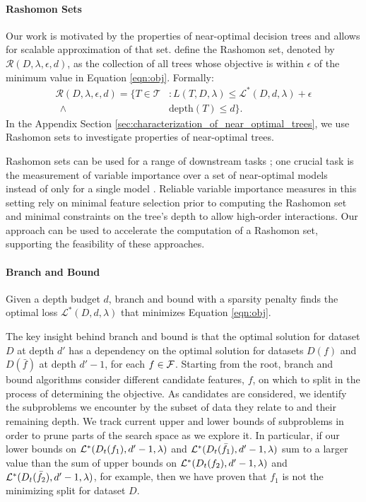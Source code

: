 \paragraph{Rashomon Sets} Our work is motivated by the properties of near-optimal decision trees and allows for scalable approximation of that set. 
\citet{xin2022treefarms} define the Rashomon set, denoted by $\mathcal{R}(D,\lambda, \epsilon,d)$, as the collection of all trees whose objective is within $\epsilon$ of the minimum value in Equation \ref{eqn:obj}. Formally: 
\begin{align} 
\mathcal{R}(D,\lambda, \epsilon,d) = \{T \in \mathcal{T}&: L(T,D, \lambda)\leq \mathcal{L}^*(D,d,\lambda) +\epsilon \nonumber \\ \ \ \land \ &\textrm{depth}(T) \leq d\}. 
\end{align} 
In the Appendix Section \ref{sec:characterization_of_near_optimal_trees}, we use Rashomon sets to investigate properties of near-optimal trees.

Rashomon sets can be used for a range of downstream tasks \cite{RudinEtAlAmazing2024}; one crucial task is the measurement of variable importance over a set of near-optimal models instead of only for a single model \cite{donnelly2023the, fisher2018model}. Reliable variable importance measures in this setting rely on minimal feature selection prior to computing the Rashomon set and minimal constraints on the tree's depth to allow high-order interactions. Our approach can be used to accelerate the computation of a Rashomon set, supporting the feasibility of these approaches. 

\paragraph{Branch and Bound}
Given a depth budget $d$, branch and bound with a sparsity penalty \citep{gosdt, gosdt_guesses} finds the optimal loss $\mathcal{L}^*(D,d,\lambda)$ that minimizes Equation \ref{eqn:obj}. 

The key insight behind branch and bound is that the optimal solution for dataset $D$ at depth $d'$ has a dependency on the optimal solution for datasets $D(f)$ and $D(\bar{f})$ at depth $d'-1$, for each $f \in \mathcal{F}$. Starting from the root, branch and bound algorithms consider different candidate features, $f$, on which to split in the process of determining the objective. As candidates are considered, we identify the subproblems we encounter by the subset of data they relate to and their remaining depth. We track current upper and lower bounds of subproblems in order to prune parts of the search space as we explore it. In particular, if our lower bounds on $ \mathcal{L}^*(D_t(f_1), d^\prime-1, \lambda)$ and $\mathcal{L}^*(D_t(\bar{f_1}), d^\prime-1, \lambda)$ sum to a larger value than the sum of upper bounds on $\mathcal{L}^*(D_t(f_2), d^\prime-1, \lambda)$ and $\mathcal{L}^*(D_t(\bar{f_2}), d^\prime-1, \lambda)$, for example, then we have proven that $f_1$ is not the minimizing split for dataset $D$.

